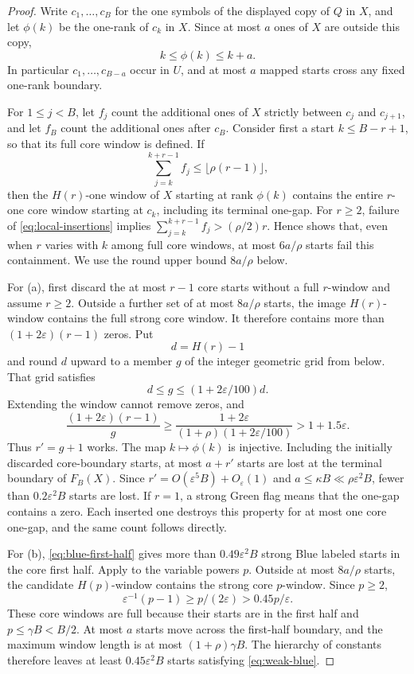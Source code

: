 \documentclass[11pt]{article}
\theoremstyle{remark}
\newcommand{\eps}{\varepsilon}
\begin{document}
\begin{proof}
Write $c_1,\ldots,c_B$ for the one symbols of the displayed copy of $Q$ in
$X$, and let $\phi(k)$ be the one-rank of $c_k$ in $X$.  Since at most $a$
ones of $X$ are outside this copy,
\begin{equation}\label{eq:phi}
 k\le\phi(k)\le k+a.
\end{equation}
In particular $c_1,\ldots,c_{B-a}$ occur in $U$, and at most $a$ mapped
starts cross any fixed one-rank boundary.

For $1\le j<B$, let $f_j$ count the additional ones of $X$ strictly between
$c_j$ and $c_{j+1}$, and let $f_B$ count the additional ones after $c_B$.
Consider first a start $k\le B-r+1$, so that its full core window is
defined.  If
\begin{equation}\label{eq:local-insertions}
 \sum_{j=k}^{k+r-1}f_j\le\lfloor\rho(r-1)\rfloor,
\end{equation}
then the $H(r)$-one window of $X$ starting at rank $\phi(k)$ contains the
entire $r$-one core window starting at $c_k$, including its terminal
one-gap.  For $r\ge2$, failure of \eqref{eq:local-insertions} implies
$\sum_{j=k}^{k+r-1}f_j>(\rho/2)r$.  Hence
 shows that, even when $r$ varies with $k$ among full core
windows, at most
$6a/\rho$ starts fail this containment.  We use the round upper bound
$8a/\rho$ below.

For (a), first discard the at most $r-1$ core starts without a full
$r$-window and assume $r\ge2$.  Outside a further set of at most
$8a/\rho$ starts,
the image $H(r)$-window contains the full strong core window.  It therefore
contains more than $(1+2\eps)(r-1)$ zeros.  Put
\[
 d=H(r)-1
\]
and round $d$ upward to a member $g$ of the integer geometric grid from
 below.  That grid satisfies
\[
 d\le g\le(1+2\eps/100)d.
\]
Extending the window cannot remove zeros, and
\[
 \frac{(1+2\eps)(r-1)}{g}
 \ge
 \frac{1+2\eps}{(1+\rho)(1+2\eps/100)}
 >1+1.5\eps.
\]
Thus $r'=g+1$ works.  The map $k\mapsto\phi(k)$ is injective.  Including the
initially discarded core-boundary starts, at most $a+r'$ starts are lost at
the terminal boundary of $F_B(X)$.  Since
$r'=O(\eps^5B)+O_\eps(1)$ and $a\le\kappa B\ll\rho\eps^2B$, fewer than
$0.2\eps^2B$ starts are lost.  If $r=1$, a strong Green flag means that the
one-gap contains a zero.  Each inserted one destroys this property for at
most one core one-gap, and the same count follows directly.

For (b), \eqref{eq:blue-first-half} gives more than $0.49\eps^2B$ strong
Blue labeled starts in the core first half.  Apply  to the
variable powers $p$.  Outside at most $8a/\rho$ starts, the candidate
$H(p)$-window contains the strong core $p$-window.  Since $p\ge2$,
\[
 \eps^{-1}(p-1)\ge p/(2\eps)>0.45p/\eps.
\]
These core windows are full because their starts are in the first half and
$p\le\gamma B<B/2$.
At most $a$ starts move across the first-half boundary, and the maximum
window length is at most $(1+\rho)\gamma B$.  The hierarchy of constants
therefore leaves at least $0.45\eps^2B$ starts satisfying
\eqref{eq:weak-blue}.


\end{proof}
\end{document}
